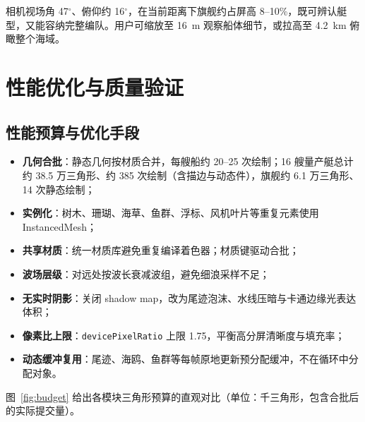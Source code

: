 \documentclass[UTF8, a4paper, 11pt]{ctexart}
\begin{document}
相机视场角 47$^\circ$、俯仰约 16$^\circ$，在当前距离下旗舰约占屏高 8--10\%，既可辨认艇型，又能容纳完整编队。用户可缩放至 16~m 观察船体细节，或拉高至 4.2~km 俯瞰整个海域。

\section{性能优化与质量验证}

\subsection{性能预算与优化手段}

\begin{itemize}
  \item \textbf{几何合批}：静态几何按材质合并，每艘船约 20--25 次绘制；16 艘量产艇总计约 38.5 万三角形、约 385 次绘制（含描边与动态件），旗舰约 6.1 万三角形、14 次静态绘制；
  \item \textbf{实例化}：树木、珊瑚、海草、鱼群、浮标、风机叶片等重复元素使用 InstancedMesh；
  \item \textbf{共享材质}：统一材质库避免重复编译着色器；材质键驱动合批；
  \item \textbf{波场层级}：对远处按波长衰减波组，避免细浪采样不足；
  \item \textbf{无实时阴影}：关闭 shadow map，改为尾迹泡沫、水线压暗与卡通边缘光表达体积；
  \item \textbf{像素比上限}：\texttt{devicePixelRatio} 上限 1.75，平衡高分屏清晰度与填充率；
  \item \textbf{动态缓冲复用}：尾迹、海鸥、鱼群等每帧原地更新预分配缓冲，不在循环中分配对象。
\end{itemize}

图~\ref{fig:budget} 给出各模块三角形预算的直观对比（单位：千三角形，包含合批后的实际提交量）。
\end{document}
